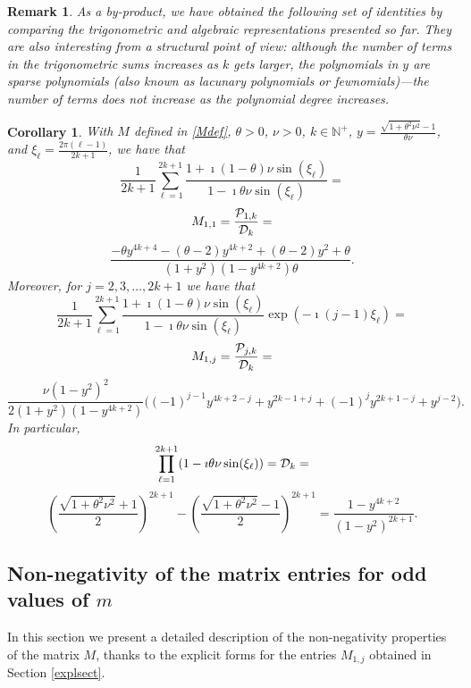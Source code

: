 \documentclass[a4paper]{article}
\newtheorem{remark}{Remark}
\newtheorem{corollary}{Corollary}
\newcommand{\te}{\theta}
\newcommand{\nplus}{\mathbb{N}^+}
\newcommand{\cP}{{\cal{P}}}
\newcommand{\cD}{{\cal{D}}}
\begin{document}
\begin{remark}
As a by-product, we have obtained the following set of identities by comparing the trigonometric and algebraic representations presented so far. They are also interesting from a structural point of view: although the number of terms in the trigonometric sums increases as $k$ gets larger, the polynomials in $y$ are sparse polynomials (also known as lacunary polynomials or fewnomials)---the number of terms does not increase as the polynomial degree increases.
\end{remark}
\begin{corollary}
With $M$ defined in \eqref{Mdef}, $\te>0$, $\nu>0$, $k\in\nplus$, $y=\frac{\sqrt{1+\te^2\nu^2}-1}{\te\nu}$, and $\xi_\ell  = \frac{2\pi(\ell-1)}{2k+1}$, we have that
\[
 \frac{1}{2k+1} \sum_{\ell=1}^{2k+1} \frac{1+\imath(1-\theta)\nu \sin(\xi_\ell)}{1-\imath\theta\nu  \sin(\xi_\ell)}=
\]
\[
M_{1,1}=\frac{\cP_{1,k}}{\cD_k}=
\]
\[
\frac{-\theta  y^{4 k+4}-(\theta -2) y^{4 k+2}+(\theta -2) y^2+\theta}{  \left(1+y^2\right)\left(1-y^{4 k+2}\right)\theta}.
\]
Moreover, for $j=2, 3, \ldots, 2k+1$ we have that
\[
\frac{1}{2k+1} \sum_{\ell=1}^{2k+1} \frac{1+\imath(1-\theta)\nu \sin(\xi_\ell)}{1-\imath\theta\nu \sin(\xi_\ell)}\exp\left(-\imath(j-1)\xi_\ell\right)=
\]
\[
M_{1,j}=\frac{\cP_{j,k}}{\cD_k}=
\]
\[
\frac{\nu  \left(1-y^2\right)^2 }{2 \left(1+y^2\right) \left(1-y^{4 k+2}\right)}\Big((-1)^{j-1} y^{4 k+2-j}+y^{2 k-1+j}+(-1)^j y^{2 k+1-j}+y^{j-2}\Big).
\]
In particular,
\[
\prod_{\ell=1}^{2k+1} (1-\imath\theta\nu \sin(\xi_\ell))=\cD_k=
\]
\[
\left(\frac{\sqrt{1+\te^2\nu^2}+1}{2}\right)^{2 k+1}- \left(\frac{\sqrt{1+\te^2\nu^2}-1}{2}\right)^{2 k+1}=
\frac{1-y^{4 k+2}}{\left(1-y^2\right)^{2 k+1} }.
\]


\end{corollary}

\subsection{Non-negativity of the matrix entries for odd values of $m$}\label{nonnegsect}

In this section we present a detailed description of the non-negativity properties of the matrix $M$, thanks to the explicit forms for the entries $M_{1,j}$ obtained in Section \ref{explsect}.

\begin{center}\end{center}
\end{document}
